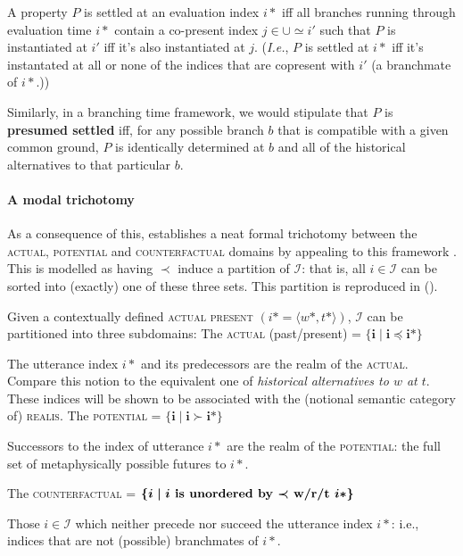 \documentclass[12pt,dvipsnames]{report}
\begin{document}
\nobreak A property $ P $ is settled at an evaluation index $ i* $ iff all branches running through evaluation time $ i* $ contain a co-present index $ j\in\cup\simeq i' $ such that $ P $ is instantiated at $ i' $ iff it's also instantiated at $ j $. (\textit{I.e.}, $ P $ is settled at $i* $ iff it's instantated at all or none of the indices that are copresent with $ i' $ (a branchmate of $ i* $.))
\xe

\noindent Similarly, in a branching time framework, we would stipulate that $ P $ is \textbf{presumed settled} iff, for any possible branch $ b $ that is compatible with a given common ground, $ P $ is identically determined at $ b $ and all of the historical alternatives to that particular $ b $.



\paragraph{A modal trichotomy} As a consequence of this,   establishes a neat formal trichotomy between the \textsc{actual, potential} and \textsc{counterfactual} domains by appealing to this framework \citetext{\citealp[see also][41]{Rumberg2016a}, \citeyear{Rumberg2019}}. This is modelled as having $ \boldsymbol{\prec} $ induce a partition of $ \mathcal I $: that is, all $ i\in\mathcal I $ can be sorted into (exactly) one of these three sets. This partition is reproduced in ().

\pex Given a contextually defined \textsc{actual present} $( i*=\langle w*,t*\rangle )$, $ \mathcal I $ can be partitioned into three subdomains:
\a The \textsc{actual} (past/present) = $\boldsymbol{ \{i\mid i\preccurlyeq i*\} }$

The utterance index $ i* $ and its predecessors are the realm of the \textsc{actual}.
Compare this notion to the equivalent one of \textit{historical alternatives to $ w $ at $ t $}. These indices will be shown to be associated with the (notional semantic category of) \textsc{realis}.
\a The \textsc{potential} = $ \boldsymbol{\{i\mid i\succ i*\} }$

Successors to the index of utterance $ i* $ are the realm of the \textsc{potential}: the full set of metaphysically possible futures to $ i* $.

\a The \textsc{counterfactual} = $\boldsymbol{ \{i\mid i \textbf{ is unordered by $ \boldsymbol\prec $ w/r/t } i* \}}$

Those $ i\in\mathcal I $ which neither precede nor succeed the utterance index $ i* $: i.e., indices that are not (possible) branchmates of $ i* $.
\end{document}

